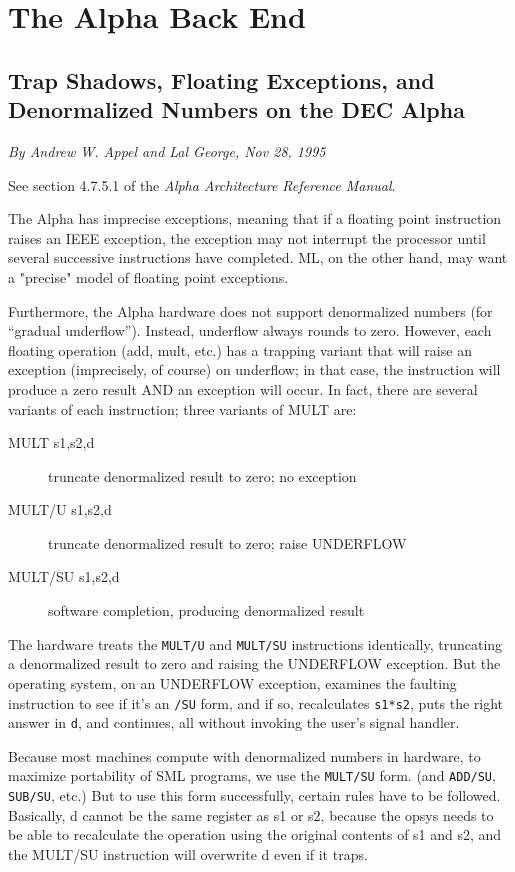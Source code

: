 \section{The Alpha Back End}

\subsection{Trap Shadows, Floating Exceptions, and Denormalized Numbers on the DEC Alpha}

  \emph{By Andrew W. Appel and Lal George, Nov 28, 1995}

  See section 4.7.5.1 of the \emph{Alpha Architecture Reference Manual}.

  The Alpha has imprecise exceptions, meaning that if a floating
  point instruction raises an IEEE exception, the exception may
  not interrupt the processor until several successive instructions have
  completed.  ML, on the other hand, may want a "precise" model
  of floating point exceptions.

  Furthermore, the Alpha hardware does not support denormalized numbers
  (for ``gradual underflow'').  Instead, underflow always rounds to zero.
  However, each floating operation (add, mult, etc.) has a trapping
  variant that will raise an exception (imprecisely, of course) on
  underflow; in that case, the instruction will produce a zero result
  AND an exception will occur.  In fact, there are several variants
  of each instruction; three variants of MULT are:
\begin{description}
 \item[MULT  s1,s2,d]  truncate denormalized result to zero; no exception
 \item[MULT/U  s1,s2,d] truncate denormalized result to zero; raise UNDERFLOW
 \item[MULT/SU  s1,s2,d]  software completion, producing denormalized result
\end{description}

  The hardware treats the \verb|MULT/U| and \verb|MULT/SU| 
  instructions identically,
  truncating a denormalized result to zero and raising the UNDERFLOW
  exception.  But the operating system, on an UNDERFLOW exception,
  examines the faulting instruction to see if it's an \verb|/SU| 
  form, and if so,
  recalculates \verb|s1*s2|, puts the right answer in \verb|d|, and continues,
  all without invoking the user's signal handler.

  Because most machines compute with denormalized numbers in hardware,
  to maximize portability of SML programs, we use the \verb|MULT/SU| form.
  (and \verb|ADD/SU|, \verb|SUB/SU|, etc.)  But to use this form successfully,
  certain rules have to be followed.  Basically, d cannot be the same
  register as s1 or s2, because the opsys needs to be able to 
  recalculate the operation using the original contents of s1 and s2,
  and the MULT/SU instruction will overwrite d even if it traps.

